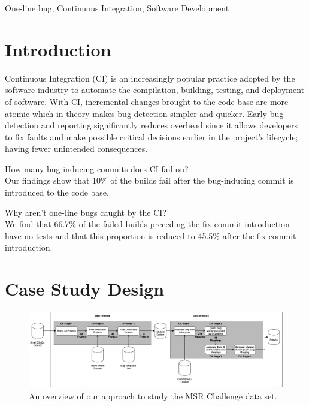 \documentclass[10pt,conference]{IEEEtran}
\begin{document}
\begin{IEEEkeywords}
	One-line bug, Continuous Integration, Software Development
\end{IEEEkeywords}

\section{Introduction}
Continuous Integration (CI) is an increasingly popular practice adopted by the software industry to automate the compilation, building, testing, and deployment of software. With CI, incremental changes brought to the code base are more atomic which in theory makes bug detection simpler and quicker. Early bug detection and reporting significantly reduces overhead since it allows developers to fix faults and make possible critical decisions earlier in the project's lifecycle; having fewer unintended consequences.


\begin{questions}
    \item How many bug-inducing commits does CI fail on? \\ Our findings show that 10\% of the builds fail after the bug-inducing commit is introduced to the code base. 
\end{questions}
\begin{questions}[resume]
    \item Why aren't one-line bugs caught by the CI? \\ We find that 66.7\% of the failed builds preceding the fix commit introduction have no tests and that this proportion is reduced to 45.5\% after the fix commit introduction. 
\end{questions}

\section{Case Study Design}
\begin{figure}[t]
\centering
\includegraphics[width=\linewidth]{process.png}
\caption{An overview of our approach to study the MSR Challenge data set.}
\label{fig:process}
\end{figure}
\end{document}
